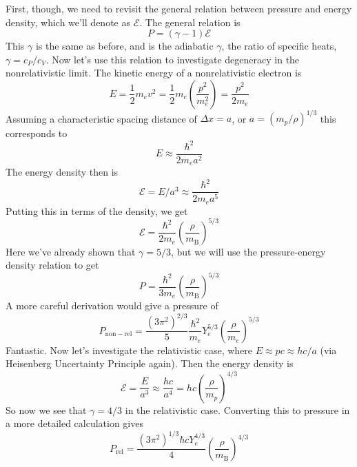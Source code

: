 \documentclass[10pt]{article}
\numberwithin{equation}{section}
\newcommand{\n}{\noindent}
\begin{document}
		\n  First, though, we need to revisit the general relation between pressure and energy density, which we'll denote as $\mathcal{E}$. The general relation is
		\begin{equation}
			\label{eq:wd_struc:25} P = (\gamma-1)\mathcal{E}
		\end{equation}
		This $\gamma$ is the same as before, and is the adiabatic $\gamma$, the ratio of specific heats, $\gamma = c_P/c_V$. Now let's use this relation to investigate degeneracy in the nonrelativistic limit. The kinetic energy of a nonrelativistic electron is
		\begin{equation}
			\label{eq:wd_struc:26} E = \frac{1}{2} m_e v^2 = \frac{1}{2} m_e\left(\frac{p^2}{m_e^2}\right) = \frac{p^2}{2m_e}
		\end{equation}
		Assuming a characteristic spacing distance of $\Delta x = a$, or $a = (m_p/\rho)^{1/3}$ this corresponds to
		\begin{equation}
			\label{eq:wd_struc:27}E \approx \frac{\hbar^2}{2m_e a^2}
		\end{equation}
		The energy density then is
		\begin{equation}
			\label{eq:wd_struc:28} \mathcal{E} = E/a^3 \approx \frac{\hbar^2}{2m_ea^5}
		\end{equation}
		Putting this in terms of the density, we get
		\begin{equation}
			\label{eq:wd_struc:29} \mathcal{E} = \frac{\hbar^2}{2m_e}\left(\frac{\rho}{m_{\mathrm{B}}}\right)^{5/3}
		\end{equation}
		Here we've already shown that $\gamma = 5/3$, but we will use the pressure-energy density relation to get
		\begin{equation}
			\label{eq:wd_struc:30} P = \frac{\hbar^2}{3m_e}\left(\frac{\rho}{m_{\mathrm{B}}}\right)^{5/3}
		\end{equation}
		A more careful derivation would give a pressure of
		\begin{equation}
			\label{eq:wd_struc:31} \boxed{P_{\mathrm{non-rel}} = \frac{(3\pi^2)^{2/3}}{5}\frac{\hbar^2}{m_e}Y_e^{5/3}\left( \frac{\rho}{m_e}\right)^{5/3}}
		\end{equation}
		Fantastic. Now let's investigate the relativistic case, where $E \approx pc \approx hc/a$ (via Heisenberg Uncertainty Principle again). Then the energy density is
		\begin{equation}
			\label{eq:wd_struc:32} \mathcal{E} = \frac{E}{a^3} \approx \frac{hc}{a^4} = hc\left(\frac{\rho}{m_p}\right)^{4/3}
		\end{equation}
		So now we see that $\gamma = 4/3$ in the relativistic case. Converting this to pressure in a more detailed calculation gives
		\begin{equation}
			\label{eq:wd_struc:33} \boxed{P_{\mathrm{rel}} = \frac{(3\pi^2)^{1/3}\hbar c Y_e^{4/3}}{4}\left(\frac{\rho}{m_{\mathrm{B}}}\right)^{4/3}}
		\end{equation}
\end{document}
